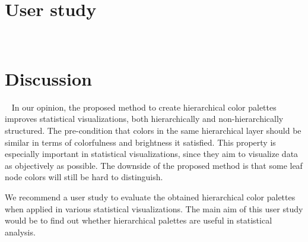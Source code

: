 \documentclass[journal]{vgtc}                %
\begin{document}
\section{User study}~\label{secuser}


\section{Discussion}~\label{secdisc}
In our opinion, the proposed method to create hierarchical color palettes improves statistical visualizations, both hierarchically and non-hierarchically structured. The pre-condition that colors in the same hierarchical layer should be similar in terms of colorfulness and brightness it satisfied. This property is especially important in statistical visualizations, since they aim to visualize data as objectively as possible. The downside of the proposed method is that some leaf node colors will still be hard to distinguish.

We recommend a user study to evaluate the obtained hierarchical color palettes when applied in various statistical visualizations. The main aim of this user study would be to find out whether hierarchical palettes are useful in statistical analysis.





\end{document}
